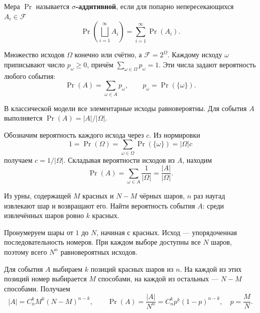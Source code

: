 \begin{definition}
    Мера $\Pr$ называется \textbf{$\sigma$-аддитивной}, если
    для попарно непересекающихся $A_i\in\mathcal{F}$
    \[
        \Pr\left(\bigsqcup_{i=1}^{\infty}A_i\right)
        =\sum_{i=1}^{\infty}\Pr(A_i).
    \]
\end{definition}


\begin{definition}
Множество исходов $\Omega$ конечно или счётно, а $\mathcal F=2^\Omega$.
Каждому исходу $\omega$ приписывают число $p_\omega\geq0$, причём
$\sum_{\omega\in\Omega}p_\omega=1$. Эти числа задают вероятность любого события:
\[
  \Pr(A)=\sum_{\omega\in A}p_\omega,\qquad
  p_\omega=\Pr(\{\omega\}).
\]
\end{definition}

\begin{theorem}
В классической модели все элементарные исходы равновероятны. Для события $A$ выполняется $\Pr(A)=|A|/|\Omega|$.
\end{theorem}
\begin{Proof}
Обозначим вероятность каждого исхода через $c$. Из нормировки
\[
1=\Pr(\Omega)=\sum_{\omega\in\Omega}\Pr(\{\omega\})=|\Omega|c
\]
получаем $c=1/|\Omega|$. Складывая вероятности исходов из $A$, находим
\[
 \Pr(A)=\sum_{\omega\in A}\frac1{|\Omega|}=\frac{|A|}{|\Omega|}.
\]
\end{Proof}


\begin{task}
Из урны, содержащей $M$ красных и $N-M$ чёрных шаров, $n$ раз наугад извлекают шар и возвращают его. Найти вероятность события $A$: среди извлечённых шаров ровно $k$ красных.
\end{task}
\begin{solution}
Пронумеруем шары от $1$ до $N$, начиная с красных. Исход — упорядоченная последовательность номеров. При каждом выборе доступны все $N$ шаров, поэтому всего $N^n$ равновероятных исходов.

\smallskip
Для события $A$ выбираем $k$ позиций красных шаров из $n$. На каждой из этих позиций номер выбирается $M$ способами, на каждой из остальных — $N-M$ способами. Получаем
\[
 |A|=C_n^k M^k(N-M)^{n-k},\qquad
 \Pr(A)=\frac{|A|}{N^n}=C_n^k p^k(1-p)^{n-k},\quad p=\frac MN.
\]
\end{solution}

